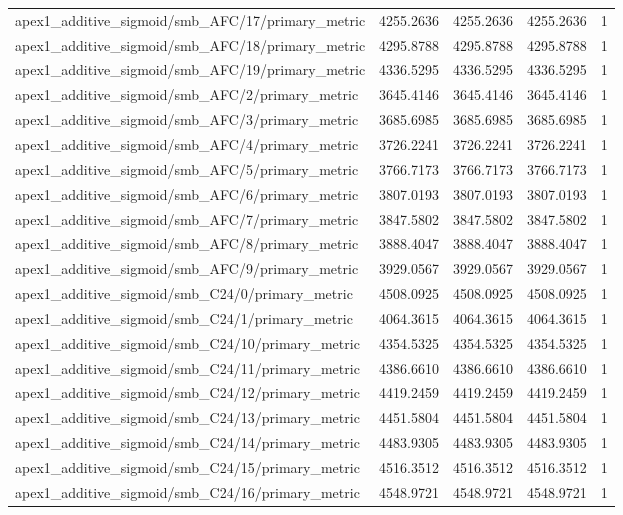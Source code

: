\begin{table}[h]
\begin{tabular}{lrrrr}
apex1_additive_sigmoid/smb_AFC/17/primary_metric & 4255.2636 & 4255.2636 & 4255.2636 & 1 \\
apex1_additive_sigmoid/smb_AFC/18/primary_metric & 4295.8788 & 4295.8788 & 4295.8788 & 1 \\
apex1_additive_sigmoid/smb_AFC/19/primary_metric & 4336.5295 & 4336.5295 & 4336.5295 & 1 \\
apex1_additive_sigmoid/smb_AFC/2/primary_metric & 3645.4146 & 3645.4146 & 3645.4146 & 1 \\
apex1_additive_sigmoid/smb_AFC/3/primary_metric & 3685.6985 & 3685.6985 & 3685.6985 & 1 \\
apex1_additive_sigmoid/smb_AFC/4/primary_metric & 3726.2241 & 3726.2241 & 3726.2241 & 1 \\
apex1_additive_sigmoid/smb_AFC/5/primary_metric & 3766.7173 & 3766.7173 & 3766.7173 & 1 \\
apex1_additive_sigmoid/smb_AFC/6/primary_metric & 3807.0193 & 3807.0193 & 3807.0193 & 1 \\
apex1_additive_sigmoid/smb_AFC/7/primary_metric & 3847.5802 & 3847.5802 & 3847.5802 & 1 \\
apex1_additive_sigmoid/smb_AFC/8/primary_metric & 3888.4047 & 3888.4047 & 3888.4047 & 1 \\
apex1_additive_sigmoid/smb_AFC/9/primary_metric & 3929.0567 & 3929.0567 & 3929.0567 & 1 \\
apex1_additive_sigmoid/smb_C24/0/primary_metric & 4508.0925 & 4508.0925 & 4508.0925 & 1 \\
apex1_additive_sigmoid/smb_C24/1/primary_metric & 4064.3615 & 4064.3615 & 4064.3615 & 1 \\
apex1_additive_sigmoid/smb_C24/10/primary_metric & 4354.5325 & 4354.5325 & 4354.5325 & 1 \\
apex1_additive_sigmoid/smb_C24/11/primary_metric & 4386.6610 & 4386.6610 & 4386.6610 & 1 \\
apex1_additive_sigmoid/smb_C24/12/primary_metric & 4419.2459 & 4419.2459 & 4419.2459 & 1 \\
apex1_additive_sigmoid/smb_C24/13/primary_metric & 4451.5804 & 4451.5804 & 4451.5804 & 1 \\
apex1_additive_sigmoid/smb_C24/14/primary_metric & 4483.9305 & 4483.9305 & 4483.9305 & 1 \\
apex1_additive_sigmoid/smb_C24/15/primary_metric & 4516.3512 & 4516.3512 & 4516.3512 & 1 \\
apex1_additive_sigmoid/smb_C24/16/primary_metric & 4548.9721 & 4548.9721 & 4548.9721 & 1 \\

\end{tabular}
\end{table}
